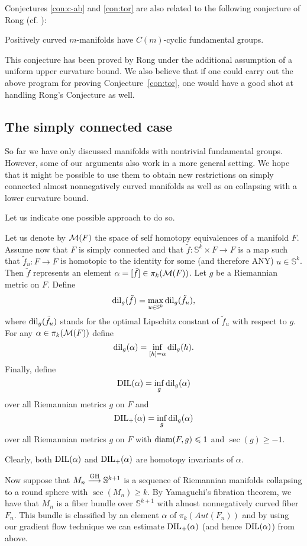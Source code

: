 \documentclass{amsart}
\begin{document}
Conjectures \ref{con:c-ab} and  \ref{con:tor} are also related to the following conjecture of Rong
(cf. \cite{Ro2,Ro1}):

\begin{conj}[Rong] \label{con:rong} Positively curved $m$-manifolds have
$C(m)$-cyclic fundamental groups.
\end{conj}

This conjecture has been proved by Rong \cite{Ro2} under the
additional assumption of a uniform upper curvature bound. We also
believe that if one could carry out the above program for proving
Conjecture~\ref{con:tor}, one would have a good shot at handling
Rong's Conjecture as well.

\subsection{The simply connected case}
So far we have only discussed manifolds with nontrivial fundamental groups.
However, some of our arguments  also work in a more general setting.
We hope that it might be possible  to use them to obtain new restrictions on simply connected almost nonnegatively curved manifolds as well as on collapsing with a lower curvature bound.

Let us indicate one possible approach to do so.

Let us denote by ${\mathcal M}(F)$ the space of self homotopy equivalences of a manifold $F$.
Assume now that $F$ is simply connected and that $\tilde f\colon \mathbb{S}^{k}\times F\to F$ is a map such that $\tilde f_u\colon F\to F$ is homotopic to the identity for some (and therefore ANY) $u\in \mathbb{S}^{k}$.
Then $\tilde f$ represents an element $\alpha=[\tilde f]\in \pi_{k}({\mathcal M}(F))$.
Let $g$ be a Riemannian metric on $F$.
Define
$$\operatorname{\rm dil}_g(\tilde f)=\max_{u\in \mathbb{S}^k}\operatorname{\rm dil}_g(\tilde f_u),$$
where  $\operatorname{\rm dil}_g(\tilde f_u)$ stands for the optimal Lipschitz constant of $\tilde f_u$ with respect to $g$.
For any $\alpha\in \pi_k({\mathcal M}(F))$ define
$$\operatorname{\rm dil}_g(\alpha)=\inf_{[h]=\alpha}\operatorname{\rm dil}_g(h).$$
Finally, define
$$\operatorname{\rm DIL}(\alpha)=\inf_g\operatorname{\rm dil}_g(\alpha)$$
over all Riemannian metrics $g$ on $F$ and
$$\operatorname{\rm DIL}_+(\alpha)=\inf_g\operatorname{\rm dil}_g(\alpha)$$
over all Riemannian metrics $g$ on $F$ with $\operatorname{\rm diam}(F,g)\leqslant 1$ and $\sec(g)\ge -1$.

Clearly, both $\operatorname{\rm DIL}(\alpha)$ and $\operatorname{\rm DIL}_+(\alpha)$ are  homotopy invariants of $\alpha$.



Now suppose that $M_n\GHto \mathbb{S}^{k+1}$ is a sequence of Riemannian manifolds collapsing to a round sphere with $\sec(M_n)\ge k$.
By Yamaguchi's fibration theorem, we have that $M_n$ is a fiber bundle over $\mathbb{S}^{k+1}$ with almost nonnegatively curved fiber $F_n$.
This bundle is classified by an element $\alpha$  of $\pi_k(Aut(F_n))$ and by using our gradient flow technique we can estimate $\operatorname{\rm DIL}_+(\alpha)$ (and hence $\operatorname{\rm DIL}(\alpha)$) from above.
\end{document}
